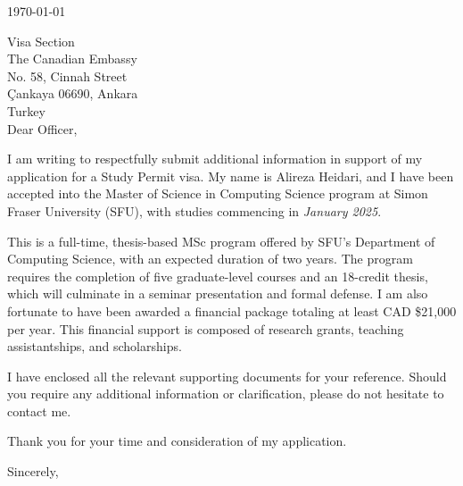 \thispagestyle{plain}

\noindent
\today

\noindent
Visa Section \\
The Canadian Embassy \\
No. 58, Cinnah Street \\
Çankaya 06690, Ankara \\
Turkey \\

Dear Officer,

I am writing to respectfully submit additional information in support of my application for a Study Permit visa. My name is Alireza Heidari, and I have been accepted into the Master of Science in Computing Science program at Simon Fraser University (SFU), with studies commencing in \textit{January 2025}.

This is a full-time, thesis-based MSc program offered by SFU’s Department of Computing Science, with an expected duration of two years. The program requires the completion of five graduate-level courses and an 18-credit thesis, which will culminate in a seminar presentation and formal defense. I am also fortunate to have been awarded a financial package totaling at least CAD \$21,000 per year. This financial support is composed of research grants, teaching assistantships, and scholarships.


I have enclosed all the relevant supporting documents for your reference. Should you require any additional information or clarification, please do not hesitate to contact me.


Thank you for your time and consideration of my application.


\noindent
Sincerely,\\
\docAuthor

\clearpage
